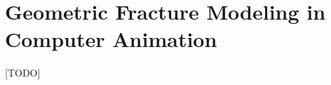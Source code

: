 %

\chapter{Geometric Fracture Modeling in Computer Animation} \label{ch:pt1.fractureanimation}

[TODO]
